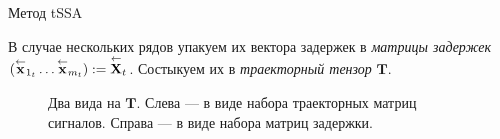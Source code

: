 	\begin{frame}{Метод tSSA}
		
		В случае нескольких рядов упакуем их вектора задержек в \emph{матрицы задержек} $ ( \overset{\leftarrow}{\textbf{x}}_{1_t} \ldots \overset{\leftarrow}{\textbf{x}}_{m_t} ) := \overset{\leftarrow}{\mathbf{X}}_{t} $. Состыкуем их в \emph{траекторный тензор} $ \textbf{T} $.
		
		\begin{figure}[h]
			\centering
			
			\caption{Два вида на $ \textbf{T} $. Слева --- в виде набора траекторных матриц сигналов. Справа --- в виде набора матриц задержки.}\label{pic:traj_tensor}
		\end{figure}
		
	\end{frame}
	
